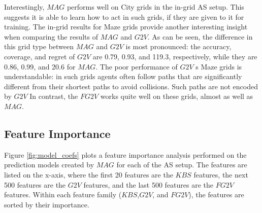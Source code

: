 \documentclass{ecai}
\newcommand{\Carmel}[1]{}
\newcommand{\Roni}[1]{}
\newcommand{\gtv}[1]{\ensuremath{\textit{G2V}}\xspace}
\newcommand{\fgtv}[1]{\ensuremath{\textit{FG2V}}\xspace}
\newcommand{\kaduri}[1]{\ensuremath{\textit{KBS}}\xspace}
\newcommand{\mapfgas}[1]{\ensuremath{\textit{MAG}}\xspace}
\begin{document}
Interestingly, \mapfgas\ performs well on City grids in the in-grid AS setup. This suggests it is able to learn how to act in such grids, if they are given to it for training. 
The in-grid results for Maze grids provide another interesting insight when comparing the results of \mapfgas\ and \gtv\ .  As can be seen, the difference in this grid type between \mapfgas\ and \gtv\ is most pronounced: the accuracy, coverage, and regret of \gtv\ are 0.79, 0.93, and 119.3, respectively, while they are 0.86, 0.99, and 20.6 for \mapfgas\ .  
The poor performance of \gtv is Maze grids is understandable: in such grids agents often follow paths that are significantly different from their shortest paths to avoid collisions. Such paths are not encoded by \gtv. In contrast, the \fgtv\ works quite well on these grids, almost as well as \mapfgas\ . 




\subsection{Feature Importance}



Figure \ref{fig:model_coefs} plots a feature importance analysis performed on the prediction models created by \mapfgas\ for each of the AS setup. The features are listed on the x-axis, where the first 20 features are the \kaduri\ features, the next 500 features are the \gtv\ features, and the last 500 features are the \fgtv\ features. Within each feature family (\kaduri\ ,\gtv\ , and \fgtv\ ), the features are sorted by their importance. 
\end{document}
